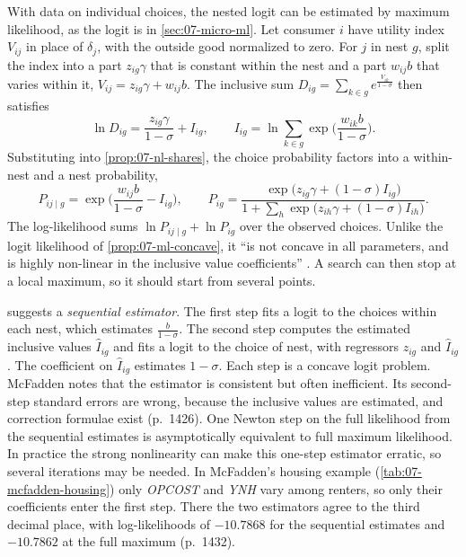With data on individual choices, the nested logit can be estimated by maximum likelihood, as the logit is in
\cref{sec:07-micro-ml}. Let consumer $i$ have utility index $V_{ij}$ in place of $\delta_j$, with the outside good
normalized to zero. For $j$ in nest $g$, split the index into a part $z_{ig}\gamma$ that is constant within the nest
and a part $w_{ij}b$ that varies within it, $V_{ij} = z_{ig}\gamma + w_{ij}b$. The inclusive sum
$D_{ig} = \sum_{k \in g}e^{\frac{V_{ik}}{1-\sigma}}$ then satisfies
\begin{equation*}
\ln D_{ig} = \frac{z_{ig}\gamma}{1-\sigma} + I_{ig}, \qquad
I_{ig} = \ln\sum_{k \in g}\exp\Big(\frac{w_{ik}b}{1-\sigma}\Big) .
\end{equation*}
Substituting into \cref{prop:07-nl-shares}, the choice probability factors into a within-nest and a nest
probability,
\begin{equation}\label{eq:07-nl-sequential}
P_{ij \mid g} = \exp\Big(\frac{w_{ij}b}{1-\sigma} - I_{ig}\Big), \qquad
P_{ig} = \frac{\exp\big(z_{ig}\gamma + (1-\sigma)I_{ig}\big)}{1 + \sum_h\exp\big(z_{ih}\gamma + (1-\sigma)I_{ih}\big)} .
\end{equation}
The log-likelihood sums $\ln P_{ij \mid g} + \ln P_{ig}$ over the observed choices. Unlike the logit likelihood of
\cref{prop:07-ml-concave}, it ``is not concave in all parameters, and is highly non-linear in the inclusive value
coefficients'' \citep[p.~1426]{McFadden1984}. A search can then stop at a local maximum, so it should start from
several points.

 suggests a \emph{sequential estimator}. The first step fits a logit to the choices within
each nest, which estimates $\frac{b}{1-\sigma}$. The second step computes the estimated inclusive values $\hat I_{ig}$
and fits a logit to the choice of nest, with regressors $z_{ig}$ and $\hat I_{ig}$. The coefficient on $\hat I_{ig}$
estimates $1 - \sigma$. Each step is a concave logit problem. McFadden notes that the estimator is consistent but
often inefficient. Its second-step standard errors are wrong, because the inclusive values are estimated, and
correction formulae exist (p.~1426). One Newton step on the full likelihood from the sequential estimates is
asymptotically equivalent to full maximum likelihood. In practice the strong nonlinearity can make this one-step
estimator erratic, so several iterations may be needed. In McFadden's housing example (\cref{tab:07-mcfadden-housing})
only \textit{OPCOST} and \textit{YNH} vary among renters, so only their coefficients enter the first step. There the
two estimators agree to the third decimal place, with log-likelihoods of $-10.7868$ for the sequential estimates and
$-10.7862$ at the full maximum (p.~1432).

